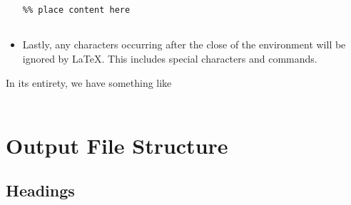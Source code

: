 \begin{itemize}
{\begin{minipage}{\linewidth}
\begin{verbatim}
%% place content here


\end{verbatim}
    \end{minipage}
  }

\item Lastly, any characters occurring after the close of the
  environment will be ignored by \LaTeX. This includes special
  characters and commands.

\end{itemize}

In its entirety, we have something like \\
 \\


\section{Output File Structure}
\subsection*{Headings}

